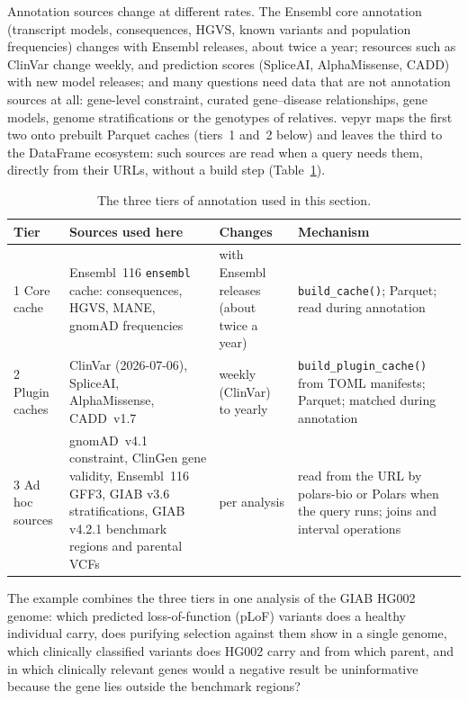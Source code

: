Annotation sources change at different rates. The Ensembl core annotation
(transcript models, consequences, HGVS, known variants and population
frequencies) changes with Ensembl releases, about twice a year; resources
such as ClinVar change weekly, and prediction scores (SpliceAI,
AlphaMissense, CADD) with new model releases; and many questions need data
that are not annotation sources at all: gene-level constraint, curated
gene--disease relationships, gene models, genome stratifications or the
genotypes of relatives. vepyr maps the first two onto prebuilt Parquet caches
(tiers~1 and~2 below) and leaves the third to the DataFrame ecosystem: such
sources are read when a query needs them, directly from their URLs, without
a build step (Table~\ref{tab:tiers}).

\begin{table}[ht]
\centering\small
\begin{tabular}{p{}p{}p{}p{}}
\toprule
Tier & Sources used here & Changes & Mechanism \\
\midrule
1 Core cache & Ensembl~116 \texttt{ensembl} cache: consequences, HGVS, MANE, gnomAD frequencies & with Ensembl releases (about twice a year) & \texttt{build\_cache()}; Parquet; read during annotation \\
2 Plugin caches & ClinVar (2026-07-06), SpliceAI, AlphaMissense, CADD~v1.7 & weekly (ClinVar) to yearly & \texttt{build\_plugin\_cache()} from TOML manifests; Parquet; matched during annotation \\
3 Ad hoc sources & gnomAD~v4.1 constraint, ClinGen gene validity, Ensembl~116 GFF3, GIAB v3.6 stratifications, GIAB v4.2.1 benchmark regions and parental VCFs & per analysis & read from the URL by polars-bio or Polars when the query runs; joins and interval operations \\
\bottomrule
\end{tabular}
\caption{The three tiers of annotation used in this section.}
\label{tab:tiers}
\end{table}

The example combines the three tiers in one analysis of the GIAB HG002
genome: which predicted loss-of-function (pLoF) variants does a healthy
individual carry, does purifying selection against them show in a single
genome, which clinically classified variants does HG002 carry and from which
parent, and in which clinically relevant genes would a negative result be
uninformative because the gene lies outside the benchmark regions?

